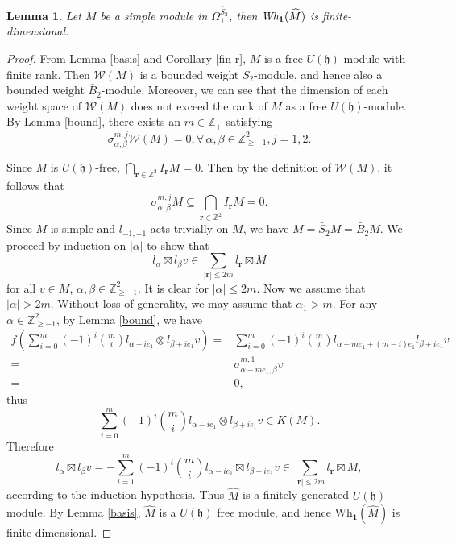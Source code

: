 \documentclass[12pt,a4paper]{amsart}
\newtheorem{Lemma}[Theorem]{Lemma}
\def\mh{\mathfrak{h}}
\def\br{\mathbf{r}}
\begin{document}
\begin{Lemma}\label{hat}
Let $M$ be a simple module in $\Omega^{\bar{S}_2}_{\mathbf{1}}$, then $\emph{Wh}_{\mathbf{1}}(\widehat{M})$ is finite-dimensional.
\end{Lemma}
\begin{proof} From Lemma \ref{basis} and Corollary \ref{fin-r}, $M$ is a free $U(\mathfrak{h})$-module with finite rank. Then $\mathcal{W}(M)$ is a bounded weight $\bar{S}_2$-module, and hence also a bounded weight $\bar{B}_2$-module.
Moreover, we can see that the dimension of each weight space of $\mathcal{W}(M)$ does not exceed the rank of $M$ as a free $U(\mathfrak{h})$-module. By Lemma \ref{bound}, there exists an $m\in \mathbb{Z}_{+}$ satisfying
$$\sigma^{m,j}_{\alpha,\beta} \mathcal{W}(M)=0,\forall \, \alpha, \beta \in \mathbb{Z}^{2}_{\geq-1},j=1,2.$$

Since $M$ is  $U(\mh)$-free, $\bigcap_{\br\in \mathbb{Z}^{2}}I_{\br}M=0$. 
Then by the definition of $\mathcal{W}(M)$, it follows that
$$\sigma^{m,j}_{\alpha,\beta}M \subseteq \bigcap_{\br\in \mathbb{Z}^{2}}I_{\br}M=0.$$
Since $M$ is simple and $l_{-1,-1}$ acts trivially on $M$, we have $M=\bar{S}_{2}M=\bar{B}_2M$. We proceed by induction on $|\alpha|$ to show that
$$l_{\alpha} \boxtimes l_{\beta}v \in \sum_{|\br|\leq 2m}l_{\br} \boxtimes M$$
for all $v\in M$, $\alpha,\beta \in \mathbb{Z}^{2}_{\geq-1}$. It is clear for $|\alpha|\leq 2m$. Now we assume that $|\alpha|> 2m$. Without loss of generality, we may assume that $\alpha_1>m$. For any $\alpha\in \mathbb{Z}^{2}_{\geq-1}$, by Lemma \ref{bound}, we have
\begin{align*}
f(\sum^{m}_{i=0}(-1)^{i} \binom{m}{i} l_{\alpha-ie_{1}} \otimes l_{\beta+ie_{1}}v)
=&\sum^{m}_{i=0}(-1)^{i} \binom{m}{i} l_{\alpha-me_{1}+(m-i)e_{1}} l_{\beta+ie_{1}}v\\
=&\sigma^{m,1}_{\alpha-me_1,\beta}v\\
=&0,
\end{align*}
thus
$$\sum^{m}_{i=0}(-1)^{i} \binom{m}{i} l_{\alpha-ie_{1}} \otimes l_{\beta+ie_{1}}v \in K(M).$$
Therefore
$$l_{\alpha} \boxtimes l_{\beta}v=-\sum^{m}_{i=1}(-1)^{i} \binom{m}{i} l_{\alpha-ie_{1}} \boxtimes l_{\beta+ie_{1}}v \in \sum_{|\br|\leq 2m}l_{\br} \boxtimes M,$$
according to the induction hypothesis. Thus $\widehat{M}$ is a finitely generated $U(\mathfrak{h})$-module. By Lemma \ref{basis}, $\widehat{M}$ is a $U(\mathfrak{h})$ free module, and hence $\text{Wh}_{\mathbf{1}}(\widehat{M})$ is finite-dimensional.
\end{proof}
\end{document}

